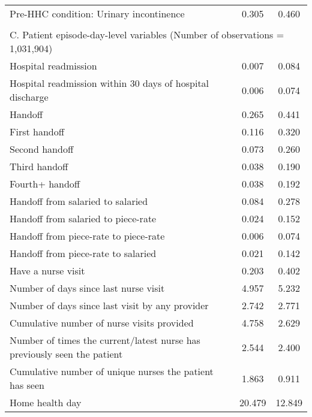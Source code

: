 \documentclass[final,12pt, notitlepage]{article}
\begin{document}
\begin{singlespace}
{\begin{longtable}{lcc}
Pre-HHC condition: Urinary incontinence & 0.305 & 0.460 \\
\\
\multicolumn{3}{l}{C. Patient episode-day-level variables (Number of observations = 1,031,904)} \\
Hospital readmission & 0.007 & 0.084 \\
Hospital readmission within 30 days of hospital discharge & 0.006 & 0.074 \\
Handoff & 0.265 & 0.441 \\
First handoff & 0.116 & 0.320 \\
Second handoff & 0.073 & 0.260 \\
Third handoff & 0.038 & 0.190 \\
Fourth+ handoff & 0.038 & 0.192 \\
Handoff from salaried to salaried & 0.084 & 0.278 \\
Handoff from salaried to piece-rate & 0.024 & 0.152 \\
Handoff from piece-rate to piece-rate & 0.006 & 0.074 \\
Handoff from piece-rate to salaried & 0.021 & 0.142 \\
Have a nurse visit & 0.203 & 0.402 \\
Number of days since last nurse visit & 4.957 & 5.232 \\
Number of days since last visit by any provider & 2.742 & 2.771 \\
Cumulative number of nurse visits provided & 4.758 & 2.629 \\
Number of times the current/latest nurse has previously seen the patient & 2.544 & 2.400 \\
Cumulative number of unique nurses the patient has seen & 1.863 & 0.911 \\
Home health day & 20.479 & 12.849 \\
\bottomrule
\end{longtable}
}






\end{singlespace}
\end{document}
